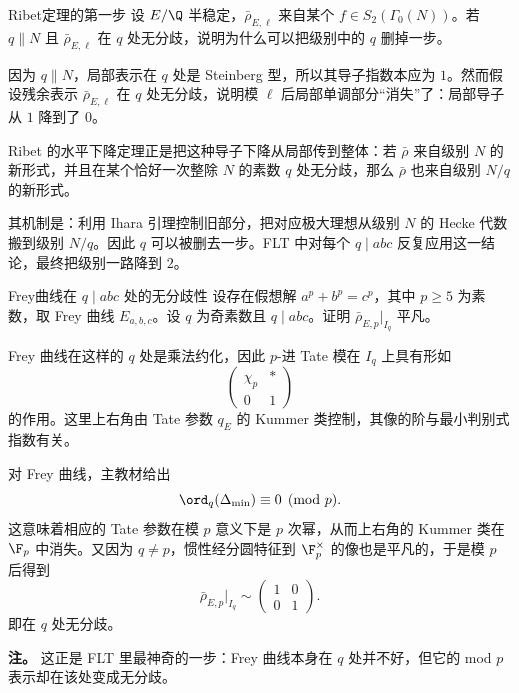 \begin{problem}{Ribet定理的第一步}
设 $E/\Q$ 半稳定，$\bar\rho_{E,\ell}$ 来自某个 $f\in S_2(\Gamma_0(N))$。若 $q\parallel N$ 且 $\bar\rho_{E,\ell}$ 在 $q$ 处无分歧，说明为什么可以把级别中的 $q$ 删掉一步。
\end{problem}
\begin{solution}
因为 $q\parallel N$，局部表示在 $q$ 处是 Steinberg 型，所以其导子指数本应为 $1$。然而假设残余表示 $\bar\rho_{E,\ell}$ 在 $q$ 处无分歧，说明模 $\ell$ 后局部单调部分“消失”了：局部导子从 $1$ 降到了 $0$。

Ribet 的水平下降定理正是把这种导子下降从局部传到整体：若 $\bar\rho$ 来自级别 $N$ 的新形式，并且在某个恰好一次整除 $N$ 的素数 $q$ 处无分歧，那么 $\bar\rho$ 也来自级别 $N/q$ 的新形式。

其机制是：利用 Ihara 引理控制旧部分，把对应极大理想从级别 $N$ 的 Hecke 代数搬到级别 $N/q$。因此 $q$ 可以被删去一步。FLT 中对每个 $q\mid abc$ 反复应用这一结论，最终把级别一路降到 $2$。
\end{solution}

\begin{problem}{Frey曲线在 $q\mid abc$ 处的无分歧性}
设存在假想解 $a^p+b^p=c^p$，其中 $p\ge5$ 为素数，取 Frey 曲线 $E_{a,b,c}$。设 $q$ 为奇素数且 $q\mid abc$。证明 $\bar\rho_{E,p}|_{I_q}$ 平凡。
\end{problem}
\begin{solution}
Frey 曲线在这样的 $q$ 处是乘法约化，因此 $p$-进 Tate 模在 $I_q$ 上具有形如
\[
\begin{pmatrix}
\chi_p & *\\0&1
\end{pmatrix}
\]
的作用。这里上右角由 Tate 参数 $q_E$ 的 Kummer 类控制，其像的阶与最小判别式指数有关。

对 Frey 曲线，主教材给出
\[
\ord_q(\Delta_{\min})\equiv0\pmod p.
\]
这意味着相应的 Tate 参数在模 $p$ 意义下是 $p$ 次幂，从而上右角的 Kummer 类在 $\F_p$ 中消失。又因为 $q\neq p$，惯性经分圆特征到 $\F_p^\times$ 的像也是平凡的，于是模 $p$ 后得到
\[
\bar\rho_{E,p}|_{I_q}\sim
\begin{pmatrix}
1&0\\0&1
\end{pmatrix}.
\]
即在 $q$ 处无分歧。

\textbf{注。} 这正是 FLT 里最神奇的一步：Frey 曲线本身在 $q$ 处并不好，但它的 mod $p$ 表示却在该处变成无分歧。
\end{solution}

